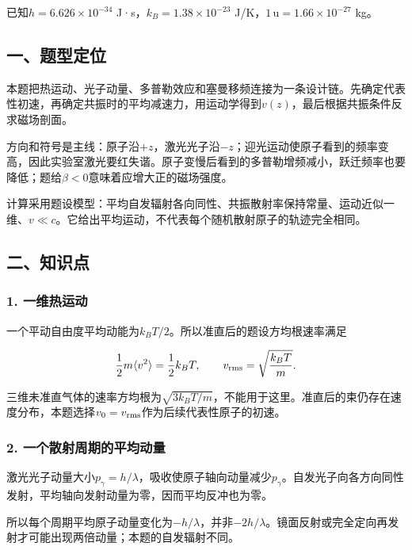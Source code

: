 \documentclass[12pt,a4paper,fontset=fandol]{ctexart}
\begin{document}
已知\(h=6.626\times10^{-34}\) J·s，\(k_B=1.38\times10^{-23}\)
J/K，\(1\,\mathrm u=1.66\times10^{-27}\) kg。

\subsection{一、题型定位}\label{ux4e00ux9898ux578bux5b9aux4f4d-4}

本题把热运动、光子动量、多普勒效应和塞曼移频连接为一条设计链。先确定代表性初速，再确定共振时的平均减速力，用运动学得到\(v(z)\)，最后根据共振条件反求磁场剖面。

方向和符号是主线：原子沿\(+z\)，激光光子沿\(-z\)；迎光运动使原子看到的频率变高，因此实验室激光要红失谐。原子变慢后看到的多普勒增频减小，跃迁频率也要降低；题给\(\beta<0\)意味着应增大正的磁场强度。

计算采用题设模型：平均自发辐射各向同性、共振散射率保持常量、运动近似一维、\(v\ll c\)。它给出平均运动，不代表每个随机散射原子的轨迹完全相同。

\subsection{二、知识点}\label{ux4e8cux77e5ux8bc6ux70b9-4}

\subsubsection{1. 一维热运动}\label{ux4e00ux7ef4ux70edux8fd0ux52a8}

一个平动自由度平均动能为\(k_BT/2\)。所以准直后的题设方均根速率满足

\[
\frac12m\langle v^2\rangle=\frac12k_BT,
\qquad v_{\rm rms}=\sqrt{\frac{k_BT}{m}}.
\]

三维未准直气体的速率方均根为\(\sqrt{3k_BT/m}\)，不能用于这里。准直后的束仍存在速度分布，本题选择\(v_0=v_{\rm rms}\)作为后续代表性原子的初速。

\subsubsection{2.
一个散射周期的平均动量}\label{ux4e00ux4e2aux6563ux5c04ux5468ux671fux7684ux5e73ux5747ux52a8ux91cf}

激光光子动量大小\(p_\gamma=h/\lambda\)，吸收使原子轴向动量减少\(p_\gamma\)。自发光子向各方向同性发射，平均轴向发射动量为零，因而平均反冲也为零。

所以每个周期平均原子动量变化为\(-h/\lambda\)，并非\(-2h/\lambda\)。镜面反射或完全定向再发射才可能出现两倍动量；本题的自发辐射不同。
\end{document}
